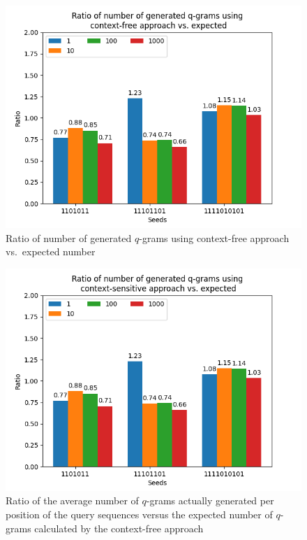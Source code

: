 \documentclass[twoside,a4paper,bsc]{master}
\newcommand{\Qgram}[1]{\(#1\)-gram}
\begin{document}
\begin{figure}
\centering
\includegraphics[scale=0.6]{graphics/threshold_contextfree.png}
\caption{Ratio of number of generated \Qgram{q}s using context-free
approach vs.\ expected number}
\label{fig:numctxfree}
\end{figure}
\begin{figure}
\centering
\includegraphics[scale=0.6]{graphics/threshold_contextsens.png}
\caption{Ratio of the average number of \(q\)-grams actually generated per
position of the query sequences versus the expected number of \(q\)-grams
calculated by the context-free approach}
\label{fig:numctxsens}
\end{figure}
\end{document}
